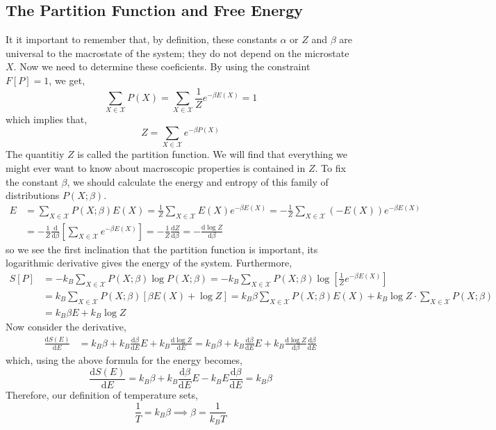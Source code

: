 \documentclass[11pt,a4paper]{article}
\renewcommand{\d}[1]{\mathrm{d}#1}
\newcommand{\deriv}[2]{\frac{\d{#1}}{\d{#2}}}
\theoremstyle{theorem}
\theoremstyle{definition}
\theoremstyle{definition}
\theoremstyle{remark}
\theoremstyle{definition}
\theoremstyle{remark}
\newcommand{\phase}{\mathscr{X}}
\begin{document}
\subsection{The Partition Function and Free Energy}

It it important to remember that, by definition, these constants $\alpha$ or $Z$ and $\beta$ are universal to the macrostate of the system; they do not depend on the microstate $X$. Now we need to determine these coeficients. By using the constraint $F[P] = 1$, we get,
\[ \sum_{X \in \phase} P(X) = \sum_{X \in \phase} \frac{1}{Z} e^{-\beta E(X)} = 1\]
which implies that,
\[ Z = \sum_{X \in \phase} e^{-\beta P(X)}\]
The quantitiy $Z$ is called the partition function. We will find that everything we might ever want to know about macroscopic properties is contained in $Z$. To fix the constant $\beta$, we should calculate the energy and entropy of this family of distributions $P(X;\beta)$. 
\begin{align*}
E & = \sum_{X \in \phase} P(X; \beta) E(X) = \frac{1}{Z} \sum_{X \in \phase} E(X) e^{-\beta E(X)} = - \frac{1}{Z} \sum_{X \in \phase} (-E(X)) e^{-\beta E(X)}
\\
& = -\frac{1}{Z} \deriv{}{\beta} \left[ \sum_{X \in \phase} e^{-\beta E(X)} \right] = - \frac{1}{Z} \deriv{Z}{\beta} = - \deriv{\log{Z}}{\beta} 
\end{align*}
so we see the first inclination that the partition function is important, its logarithmic derivative gives the energy of the system. Furthermore,
\begin{align*}
S[P] &= - k_B \sum_{X \in \phase} P(X;\beta) \log{P(X;\beta)} = - k_B \sum_{X \in \phase} P(X;\beta) \log{\left[ \frac{1}{Z} e^{-\beta E(X)} \right]} 
\\
&= k_B \sum_{X \in \phase} P(X; \beta) \left[\beta E(X) + \log{Z} \right] = k_B  \beta \sum_{X \in \phase} P(X;\beta) E(X) + k_B \log{Z} \cdot \sum_{X \in \phase} P(X;\beta) 
\\
& = k_B \beta E + k_B \log{Z}
\end{align*}
Now consider the derivative,
\begin{align*}
\deriv{S(E)}{E} & = k_B \beta + k_B \deriv{\beta}{E} E + k_B \deriv{\log{Z}}{E} = k_B \beta + k_B \deriv{\beta}{E} E + k_B \deriv{\log{Z}}{\beta} \deriv{\beta}{E} 
\end{align*}
which, using the above formula for the energy becomes,
\[\deriv{S(E)}{E} = k_B \beta + k_B \deriv{\beta}{E} E - k_B E \deriv{\beta}{E} = k_B \beta \]
Therefore, our definition of temperature sets,
\[ \frac{1}{T} = k_B \beta \implies \beta = \frac{1}{k_B T} \]
\end{document}
